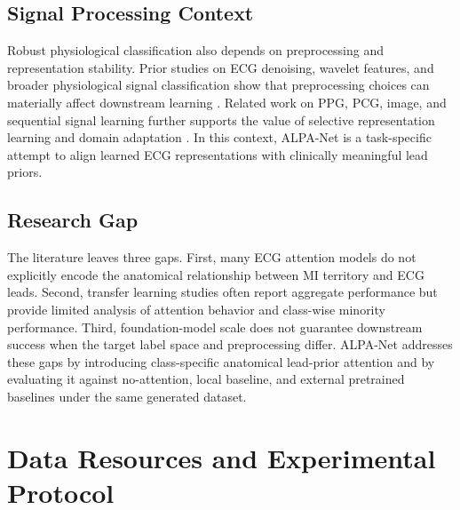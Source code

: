 \documentclass[a4paper,fleqn]{cas-dc}
\begin{document}
\subsection{Signal Processing Context}
Robust physiological classification also depends on preprocessing and representation stability.
Prior studies on ECG denoising, wavelet features, and broader physiological signal classification
show that preprocessing choices can materially affect downstream learning
\cite{MandalaFuadahArzakiPambudi2017ICoICT_ECG_Denoising,MandalaTresnasariLestari2022ICICyTA_ECG_Daubechies,MandalaWibowoAdiwijayaSuyantoZahidRizal2023ApplSci_DWBF_AF,MandalaCaiDiSunarAdiwijaya2020PLOSone_MVA_DecisionTree,MandalaCaiDi2017JMBE_MVA_Review}.
Related work on PPG, PCG, image, and sequential signal learning further supports the value of
selective representation learning and domain adaptation
\cite{ParsaoranMandalaPramudyo2022ICoDSA_PPG_Denoising,IhsanMandalaPramudyo2022ICoDSA_PPG_CHD,IqtidarQamarAzizKhan2021CBM_PCG_CAD,KommineniMandalaSunarChakravarthy2021JSC_FER_Hybrid,KommineniMandala2014ICACCI_CBirPreprocess,MandalaRamadhanIrsan2023COMNETSAT_SmartHome_CNN,Kim2023Sustainability_LSTMTL_Energy,Wang2020CSSP_LSTM_TL_RF}.
In this context, ALPA-Net is a task-specific attempt to align learned ECG representations with
clinically meaningful lead priors.

\subsection{Research Gap}
The literature leaves three gaps. First, many ECG attention models do not explicitly encode the
anatomical relationship between MI territory and ECG leads. Second, transfer learning studies often
report aggregate performance but provide limited analysis of attention behavior and class-wise
minority performance. Third, foundation-model scale does not guarantee downstream success when the
target label space and preprocessing differ. ALPA-Net addresses these gaps by introducing
class-specific anatomical lead-prior attention and by evaluating it against no-attention, local
baseline, and external pretrained baselines under the same generated dataset.

\section{Data Resources and Experimental Protocol}
\end{document}
